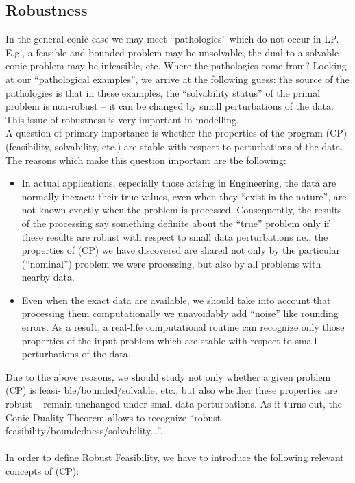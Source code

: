 \documentclass[12pt]{article}
\begin{document}
   \subsection{Robustness}
   In the general conic case we may meet “pathologies” which do not occur in LP. E.g., a feasible and bounded problem may be unsolvable, the dual to a solvable conic problem may be infeasible, etc. Where the pathologies come from? Looking at our “pathological examples”, we arrive at the following guess: the source of the pathologies is that in these examples, the “solvability status” of the primal problem is non-robust – it can be changed by small perturbations of the data. This issue of robustness is very important in modelling. \\
   A question of primary importance is whether the properties of the program (CP) (feasibility, solvability, etc.) are stable with respect to perturbations of the data. The reasons which make this question important are the following:
   \begin{itemize}
       \item In actual applications, especially those arising in Engineering, the data are normally inexact: their true values, even when they “exist in the nature”, are not known exactly when the problem is processed. Consequently, the results of the processing say something definite about the “true” problem only if these results are robust with respect to small data perturbations i.e., the properties of (CP) we have discovered are shared not only by the particular (“nominal”) problem we were processing, but also by all problems with nearby data.
       \item Even when the exact data are available, we should take into account that processing them computationally we unavoidably add “noise” like rounding errors. As a result, a real-life computational routine can recognize only those properties of the input problem which are stable with respect to small perturbations of the data. 
   \end{itemize}
   Due to the above reasons, we should study not only whether a given problem (CP) is feasi- ble/bounded/solvable, etc., but also whether these properties are robust – remain unchanged under small data perturbations. As it turns out, the Conic Duality Theorem allows to recognize “robust feasibility/boundedness/solvability...”. \\ \\
   In order to define Robust Feasibility, we have to introduce the following relevant concepts of (CP):
\end{document}
